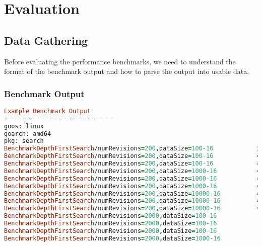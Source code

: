 \chapter{Evaluation} %
\label{chap:eval}

\section{Data Gathering}
Before evaluating the performance benchmarks, we need to understand the format of the benchmark output and how to parse the output into usable data.

\subsection*{Benchmark Output}

\begin{lstlisting}[language=prolog]
Example Benchmark Output
------------------------------
goos: linux
goarch: amd64
pkg: search
BenchmarkDepthFirstSearch/numRevisions=200,dataSize=100-16         	  393714	      8504 ns/op	    4249 B/op	      15 allocs/op
BenchmarkDepthFirstSearch/numRevisions=200,dataSize=100-16         	  419677	      8546 ns/op	    4264 B/op	      15 allocs/op
BenchmarkDepthFirstSearch/numRevisions=200,dataSize=100-16         	  420799	      8551 ns/op	    4261 B/op	      15 allocs/op
BenchmarkDepthFirstSearch/numRevisions=200,dataSize=1000-16        	  419702	      8537 ns/op	    4256 B/op	      15 allocs/op
BenchmarkDepthFirstSearch/numRevisions=200,dataSize=1000-16        	  430153	      8548 ns/op	    4267 B/op	      15 allocs/op
BenchmarkDepthFirstSearch/numRevisions=200,dataSize=1000-16        	  412516	      8536 ns/op	    4258 B/op	      15 allocs/op
BenchmarkDepthFirstSearch/numRevisions=200,dataSize=10000-16       	  410246	      8758 ns/op	    4270 B/op	      15 allocs/op
BenchmarkDepthFirstSearch/numRevisions=200,dataSize=10000-16       	  413239	      8730 ns/op	    4264 B/op	      15 allocs/op
BenchmarkDepthFirstSearch/numRevisions=200,dataSize=10000-16       	  417362	      8717 ns/op	    4264 B/op	      15 allocs/op
BenchmarkDepthFirstSearch/numRevisions=2000,dataSize=100-16        	   39650	     90070 ns/op	   47976 B/op	      68 allocs/op
BenchmarkDepthFirstSearch/numRevisions=2000,dataSize=100-16        	   39957	     90112 ns/op	   48109 B/op	      68 allocs/op
BenchmarkDepthFirstSearch/numRevisions=2000,dataSize=100-16        	   39963	     90497 ns/op	   48145 B/op	      68 allocs/op
BenchmarkDepthFirstSearch/numRevisions=2000,dataSize=1000-16       	   39520	     92031 ns/op	   48012 B/op	      68 allocs/op

\end{lstlisting}
